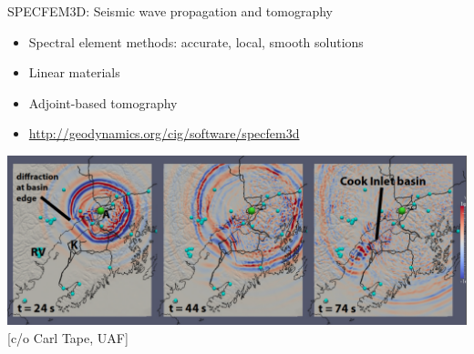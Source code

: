 \documentclass{beamer}
\begin{document}
\begin{frame}{SPECFEM3D: Seismic wave propagation and tomography}
  \begin{itemize}
  \item Spectral element methods: accurate, local, smooth solutions
  \item Linear materials
  \item Adjoint-based tomography
  \item \url{http://geodynamics.org/cig/software/specfem3d}
  \end{itemize}
  \includegraphics[width=\textwidth]{figures/TapeCookInlet.png} \\
  {[c/o Carl Tape, UAF]}
\end{frame}
\end{document}
